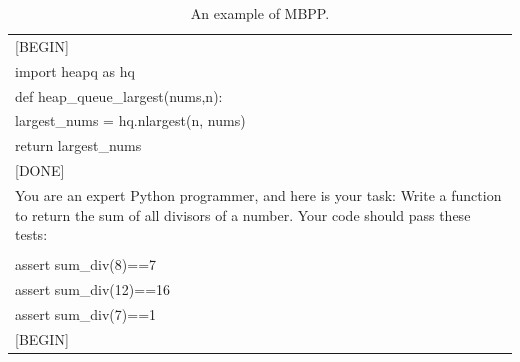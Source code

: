 \begin{table}[h]
\begin{tabular}{p{12cm}}
[BEGIN]\\
import heapq as hq\\
def heap\_queue\_largest(nums,n):\\
  largest\_nums = hq.nlargest(n, nums)\\
  return largest\_nums\\

[DONE]\\
You are an expert Python programmer, and here is your task: Write a function to return the sum of all divisors of a number. Your code should pass these tests:\\
\\
assert sum\_div(8)==7\\
assert sum\_div(12)==16\\
assert sum\_div(7)==1\\

[BEGIN]\\
\bottomrule
\end{tabular}
    \caption{\centering An example of MBPP.}
    \label{tab:mbpp_eval_format_example}
\end{table}

